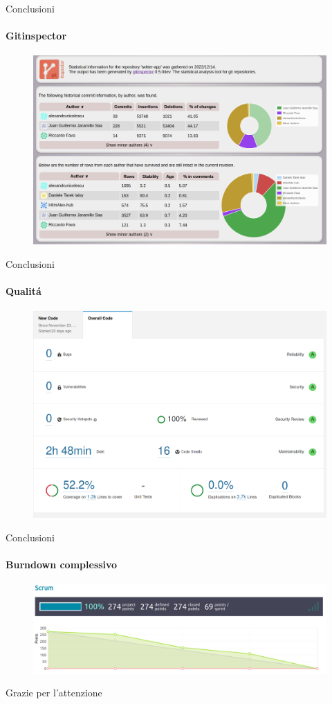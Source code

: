\documentclass[12pt, aspectration=169]{beamer}
\begin{document}
\begin{frame}{Conclusioni}
\framesubtitle{Gitinspector}
\begin{figure}[H]
    \centering
    \includegraphics[scale=0.18]{misc/inspector_finale.png}
    \label{fig:inspector}
\end{figure}
\end{frame}
\begin{frame}{Conclusioni}
\framesubtitle{Qualit\'a}
\begin{figure}[H]
    \centering
    \includegraphics[scale=0.18]{misc/qube_analysis.png}
    \label{fig:qube}
\end{figure}
\end{frame}
\begin{frame}{Conclusioni}
\framesubtitle{Burndown complessivo}
\begin{figure}[H]
    \centering
    \includegraphics[scale=0.18]{misc/burndown_finale.png}
    \label{fig:finalburndown}
\end{figure}
\end{frame}
\begin{frame}{}
\centering
{}
Grazie per l'attenzione
\end{frame}
\end{document}
